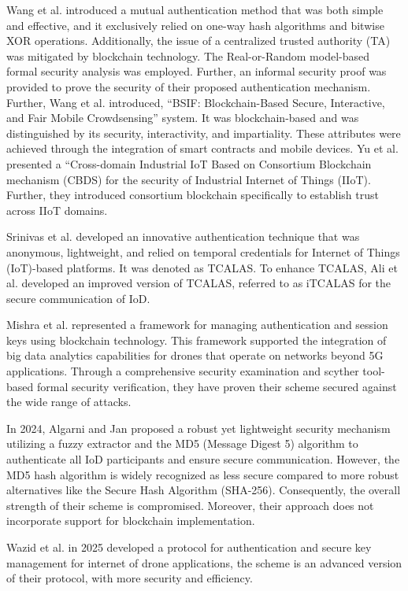 Wang et al. introduced a mutual authentication method that was both simple and effective, and it exclusively relied on one-way hash algorithms and bitwise XOR operations. Additionally, the issue of a centralized trusted authority (TA) was mitigated by blockchain technology. The Real-or-Random model-based formal security analysis was employed. Further, an informal security proof was provided to prove the security of their proposed authentication mechanism. Further, Wang et al. introduced, ``BSIF: Blockchain-Based Secure, Interactive, and Fair Mobile Crowdsensing'' system. It was blockchain-based and was distinguished by its security, interactivity, and impartiality. These attributes were achieved through the integration of smart contracts and mobile devices. Yu et al. presented a ``Cross-domain Industrial IoT Based on Consortium Blockchain mechanism (CBDS) for the security of Industrial Internet of Things (IIoT). Further, they introduced consortium blockchain specifically to establish trust across IIoT domains.

Srinivas et al. developed an innovative authentication technique that was anonymous, lightweight, and relied on temporal credentials for Internet of Things (IoT)-based platforms. It was denoted as TCALAS. To enhance TCALAS, Ali et al. developed an improved version of TCALAS, referred to as iTCALAS for the secure communication of IoD.

Mishra et al. represented a framework for managing authentication and session keys using blockchain technology. This framework supported the integration of big data analytics capabilities for drones that operate on networks beyond 5G applications. Through a comprehensive security examination and scyther tool-based formal security verification, they have proven their scheme secured against the wide range of attacks.

In 2024, Algarni and Jan proposed a robust yet lightweight security mechanism utilizing a fuzzy extractor and the MD5 (Message Digest 5) algorithm to authenticate all IoD participants and ensure secure communication. However, the MD5 hash algorithm is widely recognized as less secure compared to more robust alternatives like the Secure Hash Algorithm (SHA-256). Consequently, the overall strength of their scheme is compromised. Moreover, their approach does not incorporate support for blockchain implementation.

Wazid et al. in 2025 developed a protocol for authentication and secure key management for internet of drone applications, the scheme is an advanced version of their protocol, with more security and efficiency.

